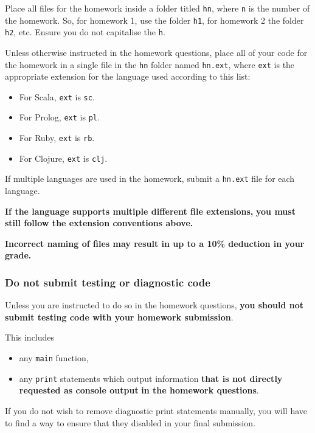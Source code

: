 \documentclass[11pt]{article}
\begin{document}
Place all files for the homework
inside a folder titled \texttt{hn}, where \texttt{n} is the number of the homework.
So, for homework 1, use the folder \texttt{h1}, for homework 2 the folder \texttt{h2}, etc.
Ensure you do not capitalise the \texttt{h}.

Unless otherwise instructed in the homework questions,
place all of your code for the homework
in a single file in the \texttt{hn} folder named \texttt{hn.ext},
where \texttt{ext} is the appropriate extension for the language used
according to this list:
\begin{itemize}
\item For Scala, \texttt{ext} is \texttt{sc}.
\item For Prolog, \texttt{ext} is \texttt{pl}.
\item For Ruby, \texttt{ext} is \texttt{rb}.
\item For Clojure, \texttt{ext} is \texttt{clj}.
\end{itemize}
If multiple languages are used in the homework,
submit a \texttt{hn.ext} file for each language.

\begin{center}
\textbf{If the language supports multiple different file extensions,}
\textbf{you must still follow the extension conventions above.}
\end{center}

\begin{center}
\textbf{Incorrect naming of files may result in up to a 10\% deduction in your grade.}
\end{center}

\subsubsection*{Do not submit testing or diagnostic code}
\label{sec:org1903f00}

Unless you are instructed to do so in the homework questions,
\textbf{you should not submit testing code with your homework submission}.

This includes
\begin{itemize}
\item any \texttt{main} function,
\item any \texttt{print} statements which output information
\textbf{that is not directly requested as console output}
\textbf{in the homework questions}.
\end{itemize}

If you do not wish to remove diagnostic print statements manually,
you will have to find a way to ensure that they disabled
in your final submission.
\end{document}
